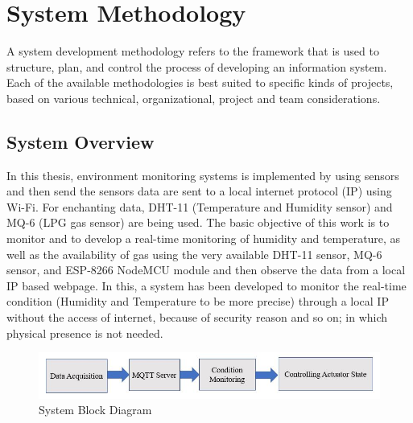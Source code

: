 \chapter{\textbf{System Methodology}}
A system development methodology refers to the framework that is used to structure, plan, and control the process of developing an information system. Each of the available methodologies is best suited to specific kinds of projects, based on various technical, organizational, project and team considerations.
\section{System Overview}
In this thesis, environment monitoring systems is implemented by using sensors and then send the sensors data are sent to a local internet protocol (IP) using Wi-Fi. For enchanting data, DHT-11 (Temperature and Humidity sensor) and MQ-6 (LPG gas sensor) are being used. The basic objective of this work is to monitor and to develop a real-time monitoring of humidity and temperature, as well as the availability of gas using the very available DHT-11 sensor, MQ-6 sensor, and ESP-8266 NodeMCU module and then observe the data from a local IP based webpage. In this, a system has been developed to monitor the real-time condition (Humidity and Temperature to be more precise) through a local IP without the access of internet, because of security reason and so on; in which physical presence is not needed.
\begin{figure}[h]
\vspace{.5in}
  \centering
  \includegraphics[width=6in]{12}
  \caption{ System Block Diagram}\label{fig12}
  \vspace{.5in}
\end{figure}
